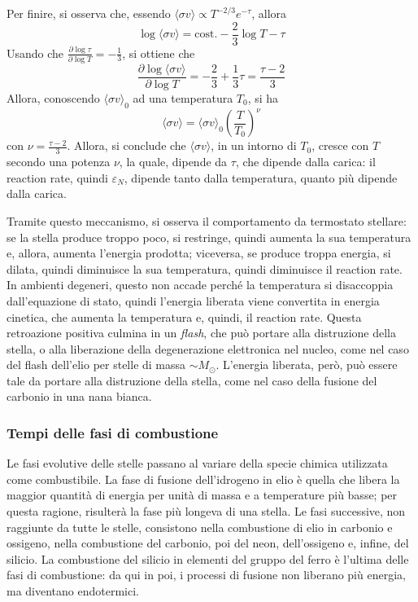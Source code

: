 \documentclass[11pt, a4paper]{scrartcl}
\theoremstyle{style}
\theoremstyle{style1}
\numberwithin{equation}{subsection}
\begin{document}
Per finire, si osserva che, essendo $\langle \sigma v \rangle\propto T^{-2 / 3} e^{-\tau }$, allora
\[
\log \langle \sigma v \rangle = \text{cost.} - \frac{2}{3} \log T - \tau 
\] 
Usando che $\frac{\partial \log \tau }{\partial \log T} = - \frac{1}{3}$, si ottiene che 
\[
\frac{\partial \log \langle \sigma v \rangle}{\partial \log T}  = -\frac{2}{3} + \frac{1}{3} \tau = \frac{\tau - 2}{3}
\] 
Allora, conoscendo $\langle \sigma v \rangle_0$ ad una temperatura $T_0$, si ha 
\begin{equation}
	\langle \sigma v \rangle = \langle \sigma v \rangle_0 \left(\frac{T}{T_0}\right) ^{\nu }
\end{equation}
con $\nu  = \frac{\tau -2}{3}$.
Allora, si conclude che $\langle \sigma v \rangle$, in un intorno di $T_0$, cresce con $T$ secondo una potenza $\nu $, la quale, dipende da $\tau $, che dipende dalla carica: il reaction rate, quindi $\varepsilon _N$, dipende tanto dalla temperatura, quanto pi\`u dipende dalla carica.

Tramite questo meccanismo, si osserva il comportamento da termostato stellare: se la stella produce troppo poco, si restringe, quindi aumenta la sua temperatura e, allora, aumenta l'energia prodotta; viceversa, se produce troppa energia, si dilata, quindi diminuisce la sua temperatura, quindi diminuisce il reaction rate.
In ambienti degeneri, questo non accade perch\'e la temperatura si disaccoppia dall'equazione di stato, quindi l'energia liberata viene convertita in energia cinetica, che aumenta la temperatura e, quindi, il reaction rate. 
Questa retroazione positiva culmina in un \textit{flash}, che pu\`o portare alla distruzione della stella, o alla liberazione della degenerazione elettronica nel nucleo, come nel caso del flash dell'elio per stelle di massa $\sim M_\odot $.
L'energia liberata, per\`o, pu\`o essere tale da portare alla distruzione della stella, come nel caso della fusione del carbonio in una nana bianca.
\subsubsection{Tempi delle fasi di combustione}

Le fasi evolutive delle stelle passano al variare della specie chimica utilizzata come combustibile. 
La fase di fusione dell'idrogeno in elio \`e quella che libera la maggior quantit\`a di energia per unit\`a di massa e a temperature pi\`u basse; per questa ragione, risulter\`a la fase pi\`u longeva di una stella.
Le fasi successive, non raggiunte da tutte le stelle, consistono nella combustione di elio in carbonio e ossigeno, nella combustione del carbonio, poi del neon, dell'ossigeno e, infine, del silicio.
La combustione del silicio in elementi del gruppo del ferro \`e l'ultima delle fasi di combustione: da qui in poi, i processi di fusione non liberano pi\`u energia, ma diventano endotermici.
\end{document}
